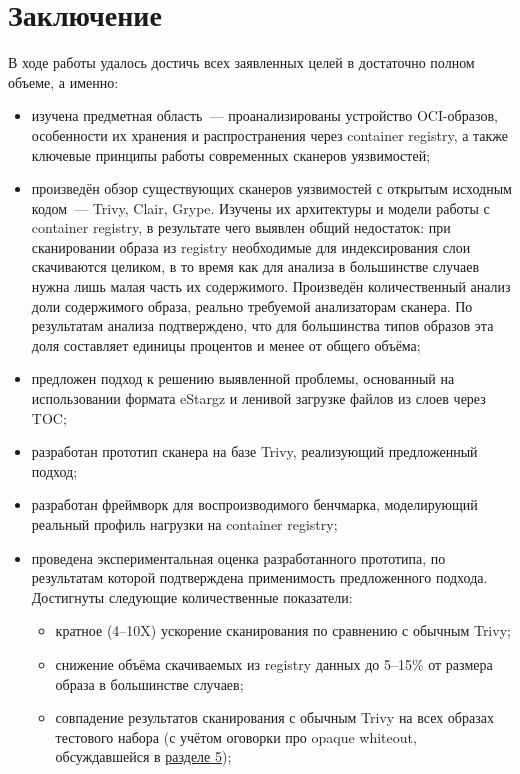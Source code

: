 \section{Заключение}
\label{sec:Chapter6} 

В ходе работы удалось достичь всех заявленных целей в достаточно полном объеме, а именно:

\begin{itemize}
\item изучена предметная область~--- проанализированы устройство OCI-образов, особенности их хранения и распространения через container registry, а также ключевые принципы работы современных сканеров уязвимостей;

\item произведён обзор существующих сканеров уязвимостей с открытым исходным кодом~--- Trivy, Clair, Grype. Изучены их архитектуры и модели работы с container registry, в результате чего выявлен общий недостаток: при сканировании образа из registry необходимые для индексирования слои скачиваются целиком, в то время как для анализа в большинстве случаев нужна лишь малая часть их содержимого. Произведён количественный анализ доли содержимого образа, реально требуемой анализаторам сканера. По результатам анализа подтверждено, что для большинства типов образов эта доля составляет единицы процентов и менее от общего объёма;

\item предложен подход к решению выявленной проблемы, основанный на использовании формата eStargz и ленивой загрузке файлов из слоев через TOC;

\item разработан прототип сканера на базе Trivy, реализующий предложенный подход;

\item разработан фреймворк для воспроизводимого бенчмарка, моделирующий реальный профиль нагрузки на container registry;

\item проведена экспериментальная оценка разработанного прототипа, по результатам которой подтверждена применимость предложенного подхода. Достигнуты следующие количественные показатели:
\begin{itemize}
\item кратное (4--10X) ускорение сканирования по сравнению с обычным Trivy;
\item снижение объёма скачиваемых из registry данных до 5--15\% от размера образа в большинстве случаев;
\item совпадение результатов сканирования с обычным Trivy на всех образах тестового набора (с учётом оговорки про opaque whiteout, обсуждавшейся в \hyperref[sec:Chapter4]{разделе 5});
\end{itemize}

\end{itemize}

